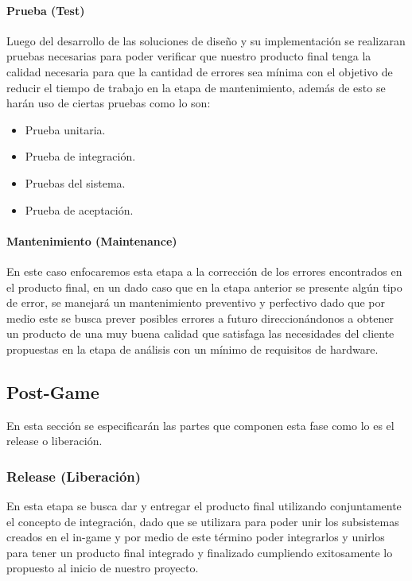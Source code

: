 \paragraph{Prueba (Test)}
Luego del desarrollo de las soluciones de diseño y su implementación se realizaran pruebas necesarias para poder verificar que nuestro producto final tenga la calidad necesaria para que la cantidad de errores sea mínima con el objetivo de reducir el tiempo de trabajo en la etapa de mantenimiento, además de esto se harán uso de ciertas pruebas como lo son:
\begin{itemize}
	\item Prueba unitaria.
	\item Prueba de integración.
	\item Pruebas del sistema.
	\item Prueba de aceptación.
\end{itemize}


\paragraph{Mantenimiento (Maintenance)}
En este caso enfocaremos esta etapa a la corrección de los errores encontrados en el producto final, en un dado caso que en la etapa anterior se presente algún tipo de error, se manejará un mantenimiento preventivo y perfectivo dado que por medio este se busca prever posibles errores a futuro direccionándonos a obtener un producto de una muy buena calidad que satisfaga las necesidades del cliente propuestas en la etapa de análisis con un mínimo de requisitos de hardware.


\subsection{Post-Game}
En esta sección se  especificarán las partes que componen esta fase como lo es el release o liberación.

\subsubsection{Release (Liberación)}
En esta etapa se busca dar y entregar el producto final utilizando conjuntamente el concepto de integración, dado que se utilizara para poder unir los subsistemas creados en el in-game y por medio de este término poder integrarlos y unirlos para tener un producto final integrado y finalizado cumpliendo exitosamente lo propuesto al inicio de nuestro proyecto.


